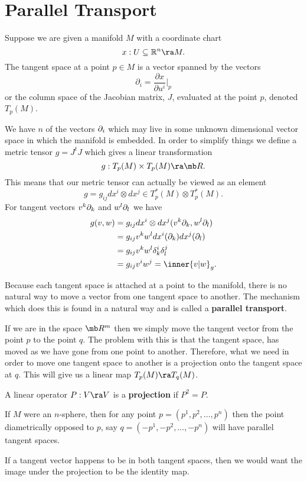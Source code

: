 \section{Parallel Transport}

Suppose we are given a manifold $M$ with a coordinate chart
\begin{equation*}
    x:U \subseteq \mathbb{R}^n \ra M.
\end{equation*}
The tangent space at a point $p \in M$ is a vector spanned by the vectors
\begin{equation*}
    \partial_i = \dfrac{\partial x}{\partial u^i}\biggl\lvert_p
\end{equation*}
or the column space of the Jacobian matrix, $J$,  evaluated at the point $p$, denoted $T_p(M)$.

We have $n$ of the vectors $\partial_i$ which may live in some unknown dimensional vector space in which the manifold is embedded.
In order to simplify things we define a metric tensor $g = J^tJ$ which gives a linear transformation 
\begin{equation*}
    g:T_p(M) \times T_p(M) \ra \mb R.
\end{equation*}
This means that our metric tensor can actually be viewed as an element 
\begin{equation*}
    g = g_{ij} dx^i\otimes dx^j \in T^\ast_p(M) \otimes T^\ast_p(M).
\end{equation*}
For tangent vectors $v^k\partial_k$ and $w^l\partial_l$ we have
\begin{align*}
    g(v,w) &= g_{ij}dx^i\otimes dx^j(v^k\pd_k, w^l\pd_l) \\
    &= g_{ij}v^kw^ldx^i(\pd_k)dx^j(\pd_l) \\
    &= g_{ij}v^kw^l \delta^i_k\delta^j_l\\
    &= g_{ij}v^iw^j = \inner{v|w}_g.
\end{align*}

Because each tangent space is attached at a point to the manifold, there is no natural way to move a vector from one tangent space to another.
The mechanism which does this is found in a natural way and is called a \textbf{parallel transport}.

If we are in the space $\mb R^m$ then we simply move the tangent vector from the point $p$ to the point $q$.
The problem with this is that the tangent space, has moved as we have gone from one point to another.
Therefore, what we need in order to move one tangent space to another is a projection onto the tangent space at $q$.
This will give us a linear map $T_p(M) \ra T_q(M)$.  
\begin{defn}
    A linear operator $P:V \ra V$ is a \textbf{projection} if $P^2 = P$.  
\end{defn}
If $M$ were an $n$-sphere, then for any point $p = (p^1,p^2,\ldots,p^n)$ then the point diametrically opposed to $p$, say $q = (-p^1,-p^2,\ldots,-p^n)$ will have parallel tangent spaces.

If a tangent vector happens to be in both tangent spaces, then we would want the image under the projection to be the identity map.


